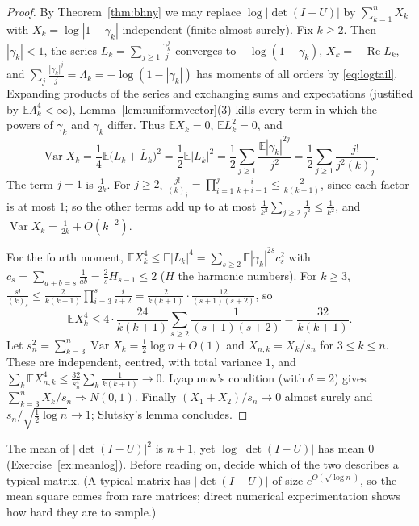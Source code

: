 \begin{proof}
By Theorem~\ref{thm:bhny} we may replace $\log|\det(I-U)|$ by $\sum_{k=1}^nX_k$ with $X_k=\log|1-\gamma_k|$ independent (finite almost surely). Fix $k\ge2$. Then $|\gamma_k|<1$, the series $L_k=\sum_{j\ge1}\frac{\gamma_k^j}j$ converges to
$-\log(1-\gamma_k)$, $X_k=-\operatorname{Re}L_k$, and $\sum_j\frac{|\gamma_k|^j}j=\Lambda_k=-\log(1-|\gamma_k|)$ has moments of all orders by \eqref{eq:logtail}. Expanding products of the series and exchanging sums and expectations (justified by
$\mathbb E\Lambda_k^4<\infty$), Lemma~\ref{lem:uniformvector}(3) kills every term in which the powers of $\gamma_k$ and $\bar\gamma_k$ differ. Thus $\mathbb EX_k=0$, $\mathbb EL_k^2=0$, and
\[
\operatorname{Var}X_k=\frac14\mathbb E\bigl(L_k+\bar L_k\bigr)^2=\frac12\mathbb E|L_k|^2=\frac12\sum_{j\ge1}\frac{\mathbb E|\gamma_k|^{2j}}{j^2}=\frac12\sum_{j\ge1}\frac{j!}{j^2(k)_j}.
\]
The term $j=1$ is $\frac1{2k}$. For $j\ge2$, $\frac{j!}{(k)_j}=\prod_{i=1}^j\frac i{k+i-1}\le\frac2{k(k+1)}$, since each factor is at most $1$; so the other terms add up to at most $\frac1{k^2}\sum_{j\ge2}\frac1{j^2}\le\frac1{k^2}$, and $\operatorname{Var}X_k=\frac1{2k}+O(k^{-2})$.

For the fourth moment, $\mathbb EX_k^4\le\mathbb E|L_k|^4=\sum_{s\ge2}\mathbb E|\gamma_k|^{2s}c_s^2$ with $c_s=\sum_{a+b=s}\frac1{ab}=\frac2sH_{s-1}\le2$ ($H$ the harmonic numbers). For $k\ge3$, $\frac{s!}{(k)_s}\le\frac2{k(k+1)}\prod_{i=3}^s\frac i{i+2}=\frac2{k(k+1)}\cdot\frac{12}{(s+1)(s+2)}$, so
\[
\mathbb EX_k^4\le4\cdot\frac{24}{k(k+1)}\sum_{s\ge2}\frac1{(s+1)(s+2)}=\frac{32}{k(k+1)}.
\]
Let $s_n^2=\sum_{k=3}^n\operatorname{Var}X_k=\frac12\log n+O(1)$ and $X_{n,k}=X_k/s_n$ for $3\le k\le n$. These are independent, centred, with total variance $1$, and $\sum_k\mathbb EX_{n,k}^4\le\frac{32}{s_n^4}\sum_k\frac1{k(k+1)}\to0$. Lyapunov's condition
(with $\delta=2$) gives $\sum_{k=3}^nX_k/s_n\Rightarrow N(0,1)$. Finally $(X_1+X_2)/s_n\to0$ almost surely and $s_n/\sqrt{\frac12\log n}\to1$; Slutsky's lemma concludes.
\end{proof}

\begin{think}
The mean of $|\det(I-U)|^2$ is $n+1$, yet $\log|\det(I-U)|$ has mean $0$ (Exercise~\ref{ex:meanlog}). Before reading on, decide which of the two describes a typical matrix. (A typical matrix has $|\det(I-U)|$ of size $e^{O(\sqrt{\log n})}$, so the mean square comes from rare matrices; direct numerical experimentation shows how hard they are to sample.)
\end{think}

